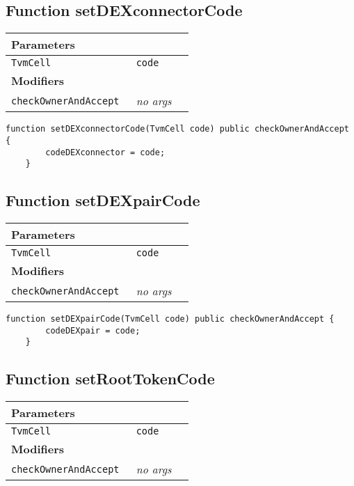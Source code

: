 \subsection{Function setDEXconnectorCode}


\ifsoltables
\noindent\begin{tabular}{|l|l|p{5cm}|}\hline
\multicolumn{3}{|l|}{\bf Parameters}\\\hline
\tt TvmCell & \tt code &\\\hline
\multicolumn{3}{|l|}{\bf Modifiers}\\\hline
\tt checkOwnerAndAccept & {\em no args} &\\\hline
\end{tabular}
\fi

\vspace{2cm}

\begin{lstlisting}[firstnumber=88]
	function setDEXconnectorCode(TvmCell code) public checkOwnerAndAccept {
		codeDEXconnector = code;
	}
\end{lstlisting}

\subsection{Function setDEXpairCode}


\ifsoltables
\noindent\begin{tabular}{|l|l|p{5cm}|}\hline
\multicolumn{3}{|l|}{\bf Parameters}\\\hline
\tt TvmCell & \tt code &\\\hline
\multicolumn{3}{|l|}{\bf Modifiers}\\\hline
\tt checkOwnerAndAccept & {\em no args} &\\\hline
\end{tabular}
\fi

\vspace{2cm}

\begin{lstlisting}[firstnumber=84]
	function setDEXpairCode(TvmCell code) public checkOwnerAndAccept {
		codeDEXpair = code;
	}
\end{lstlisting}

\subsection{Function setRootTokenCode}


\ifsoltables
\noindent\begin{tabular}{|l|l|p{5cm}|}\hline
\multicolumn{3}{|l|}{\bf Parameters}\\\hline
\tt TvmCell & \tt code &\\\hline
\multicolumn{3}{|l|}{\bf Modifiers}\\\hline
\tt checkOwnerAndAccept & {\em no args} &\\\hline
\end{tabular}
\fi

